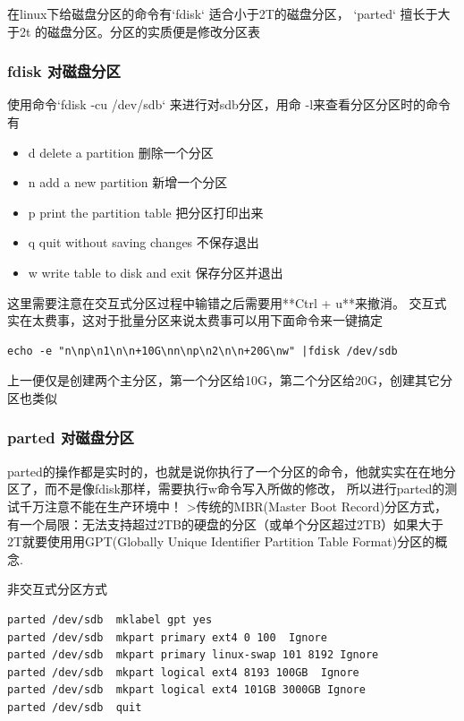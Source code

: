 在linux下给磁盘分区的命令有`fdisk` 适合小于2T的磁盘分区， `parted` 擅长于大于2t 的磁盘分区。分区的实质便是修改分区表

\subsubsection{ fdisk 对磁盘分区}
使用命令`fdisk -cu /dev/sdb` 来进行对sdb分区，用命 -l来查看分区分区时的命令有

\begin{itemize}
\item  d   delete a partition 删除一个分区
\item  n   add a new partition       新增一个分区
\item  p   print the partition table 把分区打印出来
\item  q   quit without saving changes 不保存退出
\item  w   write table to disk and exit  保存分区并退出
\end{itemize}

这里需要注意在交互式分区过程中输错之后需要用**Ctrl + u**来撤消。 交互式实在太费事，这对于批量分区来说太费事可以用下面命令来一键搞定
\begin{lstlisting}
echo -e "n\np\n1\n\n+10G\nn\np\n2\n\n+20G\nw" |fdisk /dev/sdb
\end{lstlisting}

上一便仅是创建两个主分区，第一个分区给10G，第二个分区给20G，创建其它分区也类似

\subsubsection{ parted 对磁盘分区}
parted的操作都是实时的，也就是说你执行了一个分区的命令，他就实实在在地分区了，而不是像fdisk那样，需要执行w命令写入所做的修改， 所以进行parted的测试千万注意不能在生产环境中！
>传统的MBR(Master Boot Record)分区方式，有一个局限：无法支持超过2TB的硬盘的分区（或单个分区超过2TB）如果大于2T就要使用用GPT(Globally Unique Identifier Partition Table Format)分区的概念.

非交互式分区方式

\begin{lstlisting}
parted /dev/sdb  mklabel gpt yes
parted /dev/sdb  mkpart primary ext4 0 100  Ignore
parted /dev/sdb  mkpart primary linux-swap 101 8192 Ignore
parted /dev/sdb  mkpart logical ext4 8193 100GB  Ignore
parted /dev/sdb  mkpart logical ext4 101GB 3000GB Ignore
parted /dev/sdb  quit
\end{lstlisting}

